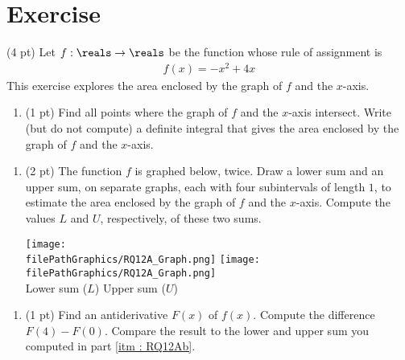 %
%
%
%

\section{Exercise}


(4 pt) Let $f : \reals \rightarrow \reals$ be the function whose rule of assignment is
\begin{align*}
f(x)
=
-x^{2} + 4 x
\end{align*}
This exercise explores the area enclosed by the graph of $f$ and the $x$-axis.



\begin{enumerate}[label=(\alph*)]
\item\label{itm : RQ12a} (1 pt) Find all points where the graph of $f$ and the $x$-axis intersect. Write (but do not compute) a definite integral that gives the area enclosed by the graph of $f$ and the $x$-axis.
\end{enumerate}

\spaceSolution{1in}{%
}%



\begin{enumerate}[resume,label=(\alph*)]
\item\label{itm : RQ12Ab} (2 pt) The function $f$ is graphed below, twice. Draw a lower sum and an upper sum, on separate graphs, each with four subintervals of length $1$, to estimate the area enclosed by the graph of $f$ and the $x$-axis. Compute the values $L$ and $U$, respectively, of these two sums.
\begin{center}
\texttt{[image: \\filePathGraphics/RQ12A\_Graph.png]}%
\hspace{1in}
\texttt{[image: \\filePathGraphics/RQ12A\_Graph.png]}%
\\
Lower sum ($L$)
\hspace{2in}
Upper sum ($U$)
\end{center}
\end{enumerate}

\spaceSolution{1in}{%
}%



\begin{enumerate}[resume,label=(\alph*)]
\item\label{itm : RQ12Ac} (1 pt) Find an antiderivative $F(x)$ of $f(x)$. Compute the difference $F(4) - F(0)$. Compare the result to the lower and upper sum you computed in part \ref{itm : RQ12Ab}.
\end{enumerate}

\spaceSolution{2in}{%
}%